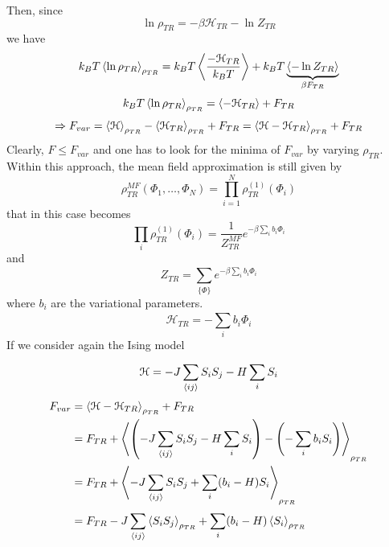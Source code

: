\documentclass[../main/main.tex]{subfiles}
\begin{document}
Then, since
\begin{equation}
  \ln{\rho _{TR}} = - \beta \mathcal{H}_{TR} - \ln{Z_{TR}}
\end{equation}
we have
\begin{equation}
  k_B T \expval{\ln{\rho _{TR}} }_{\rho _{TR}} = k_B T \expval{\frac{- \mathcal{H}_{TR}}{k_B T}} + k_B T \underbrace{\expval{- \ln{Z_{TR}} } }_{\beta F_{TR}}
\end{equation}
\begin{equation}
  k_B T \expval{\ln{\rho _{TR}} }_{\rho _{TR}} = \expval{- \mathcal{H}_{TR}} + F_{TR}
\end{equation}
\begin{equation}
  \Rightarrow F_{var} = \expval{\mathcal{H}}_{\rho _{TR}} - \expval{\mathcal{H}_{TR}}_{\rho _{TR}}  + F_{TR}
  = \expval{\mathcal{H}- \mathcal{H}_{TR}}_{\rho _{TR}} + F_{TR}
\end{equation}
Clearly, \( F \le F_{var} \) and one has to look for the minima of \( F_{var} \) by varying \( \rho _{TR} \).
Within this approach, the  mean field approximation is still given by
\begin{equation}
  \rho _{TR}^{MF} (\Phi _1, \dots, \Phi _N) = \prod_{i=1}^{N} \rho _{TR}^{(1)} (\Phi _i)
\end{equation}
that in this case becomes
\begin{equation}
  \prod_{i}^{} \rho _{TR}^{(1)} (\Phi _i) = \frac{1}{Z_{TR}^{MF}} e^{-\beta \sum_{i}^{} b_i \Phi _i  }
\end{equation}
and
\begin{equation}
  Z_{TR} = \sum_{\{ \Phi  \}  }^{}  e^{-\beta \sum_{i}^{} b_i \Phi _i  }
\end{equation}
where \( b_i \) are the variational parameters.
\begin{equation}
  \mathcal{H}_{TR} = - \sum_{i}^{} b_i \Phi _i
\end{equation}
If we consider again the Ising model
\begin{equation}
  \mathcal{H} = - J \sum_{\expval{ij} }^{} S_i S_j - H \sum_{i}^{} S_i
\end{equation}
\begin{equation}
\begin{split}
F_{var}  &= \expval{\mathcal{H} - \mathcal{H}_{TR}}_{\rho _{TR}} + F_{TR}   \\
& = F_{TR} + \expval{\qty(- J \sum_{\expval{ij} }^{} S_i S_j - H \sum_{i}^{} S_i    ) - \qty(- \sum_{i}^{} b_i S_i )  }_{\rho _{TR}} \\
& = F_{TR} + \expval{-J \sum_{\expval{ij} }^{} S_i S_j + \sum_{i}^{} (b_i-H) S_i   }_{\rho _{TR}} \\
& = F_{TR} - J \sum_{\expval{ij} }^{} \expval{S_i S_j}_{\rho _{TR}} + \sum_{i}^{} (b_i - H) \expval{S_i}_{\rho _{TR}}
\end{split}
\end{equation}
\end{document}
